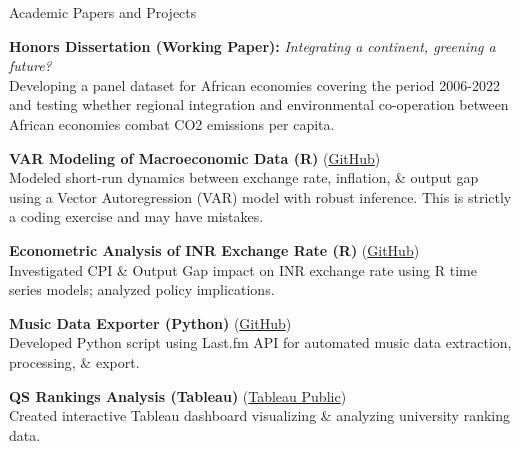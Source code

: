 \documentclass{resume} %
\begin{document}
	\begin{rSection}{Academic Papers and Projects}
		
		\textbf{Honors Dissertation (Working Paper):} \textit{Integrating a continent, greening a future?} \\
		Developing a panel dataset for African economies covering the period 2006-2022 and testing whether regional integration and environmental co-operation between African economies combat CO2 emissions per capita.
		
		\textbf{VAR Modeling of Macroeconomic Data (R)} (\href{https://github.com/HKay111/Macroeconomic-Analysis-R}{GitHub})\\
		Modeled short-run dynamics between exchange rate, inflation, \& output gap using a Vector Autoregression (VAR) model with robust inference. This is strictly a coding exercise and may have mistakes.
		
		\textbf{Econometric Analysis of INR Exchange Rate (R)} (\href{https://github.com/HKay111/IGD-Project}{GitHub})\\
		Investigated CPI \& Output Gap impact on INR exchange rate using R time series models; analyzed policy implications.
		
		\textbf{Music Data Exporter (Python)} (\href{https://github.com/HKay111}{GitHub})\\
		Developed Python script using Last.fm API for automated music data extraction, processing, \& export.
		
		\textbf{QS Rankings Analysis (Tableau)} (\href{https://public.tableau.com/app/profile/hridayam.kapila/vizzes}{Tableau Public})\\
		Created interactive Tableau dashboard visualizing \& analyzing university ranking data.
		
	\end{rSection}
	
	
\end{document}

